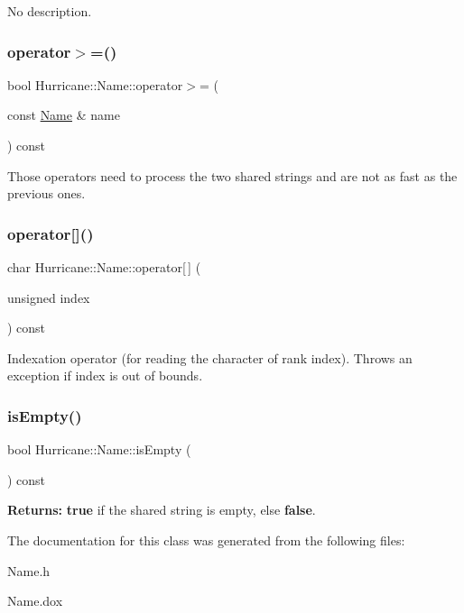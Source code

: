 No description. \mbox{\label{classHurricane_1_1Name_a241d0568f16c8ba60d4c5148be6a48b3}} 
\subsubsection{\texorpdfstring{operator$>$=()}{operator>=()}}
{\footnotesize\ttfamily bool Hurricane\+::\+Name\+::operator$>$= (\begin{DoxyParamCaption}\item[{const \hyperlink{classHurricane_1_1Name}{Name} \&}]{name }\end{DoxyParamCaption}) const}

Those operators need to process the two shared strings and are not as fast as the previous ones. \mbox{\label{classHurricane_1_1Name_a2e6f3869321016de8f98f2b35f136ab4}} 
\subsubsection{\texorpdfstring{operator[]()}{operator[]()}}
{\footnotesize\ttfamily char Hurricane\+::\+Name\+::operator\mbox{[}$\,$\mbox{]} (\begin{DoxyParamCaption}\item[{unsigned}]{index }\end{DoxyParamCaption}) const}

Indexation operator (for reading the character of rank index). Throws an exception if index is out of bounds. \mbox{\label{classHurricane_1_1Name_a6c05cf200a0aeb95f98603fa0c9c9d4b}} 
\subsubsection{\texorpdfstring{is\+Empty()}{isEmpty()}}
{\footnotesize\ttfamily bool Hurricane\+::\+Name\+::is\+Empty (\begin{DoxyParamCaption}{ }\end{DoxyParamCaption}) const}

{\bfseries Returns\+:} {\bfseries true} if the shared string is empty, else {\bfseries false}. 

The documentation for this class was generated from the following files\+:\begin{DoxyCompactItemize}
\item 
Name.\+h\item 
Name.\+dox\end{DoxyCompactItemize}
